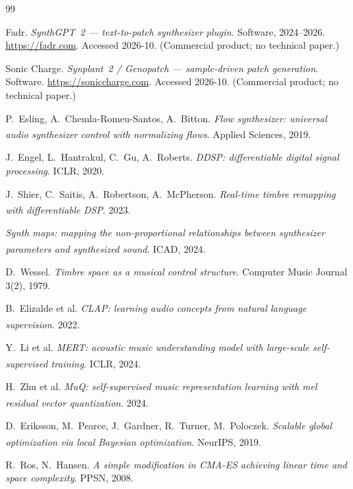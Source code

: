 \documentclass[11pt]{article}
\begin{document}
\begin{thebibliography}{99}\small

 Fadr. \emph{SynthGPT~2 --- text-to-patch synthesizer plugin}.
  Software, 2024--2026. \url{https://fadr.com}. Accessed 2026-10. (Commercial
  product; no technical paper.)

 Sonic Charge. \emph{Synplant~2 / Genopatch ---
  sample-driven patch generation}. Software.
  \url{https://soniccharge.com}. Accessed 2026-10. (Commercial product; no
  technical paper.)

 P.~Esling, A.~Chemla-Romeu-Santos, A.~Bitton.
  \emph{Flow synthesizer: universal audio synthesizer control with normalizing
  flows}. Applied Sciences, 2019.\textsuperscript{\dag}

 J.~Engel, L.~Hantrakul, C.~Gu, A.~Roberts.
  \emph{DDSP: differentiable digital signal processing}. ICLR, 2020.

 J.~Shier, C.~Saitis, A.~Robertson, A.~McPherson.
  \emph{Real-time timbre remapping with differentiable DSP}. 2023.\textsuperscript{\dag}

 \emph{Synth maps: mapping the non-proportional relationships
  between synthesizer parameters and synthesized sound}. ICAD, 2024.\textsuperscript{\dag}

 D.~Wessel. \emph{Timbre space as a musical control structure}.
  Computer Music Journal 3(2), 1979.

 B.~Elizalde et al. \emph{CLAP: learning audio concepts from
  natural language supervision}. 2022.\textsuperscript{\dag}

 Y.~Li et al. \emph{MERT: acoustic music understanding model with
  large-scale self-supervised training}. ICLR, 2024.\textsuperscript{\dag}

 H.~Zhu et al. \emph{MuQ: self-supervised music representation
  learning with mel residual vector quantization}. 2024.\textsuperscript{\dag}

 D.~Eriksson, M.~Pearce, J.~Gardner, R.~Turner, M.~Poloczek.
  \emph{Scalable global optimization via local Bayesian optimization}. NeurIPS,
  2019.\textsuperscript{\dag}

 R.~Ros, N.~Hansen. \emph{A simple modification in CMA-ES
  achieving linear time and space complexity}. PPSN, 2008.


\end{thebibliography}
\end{document}
